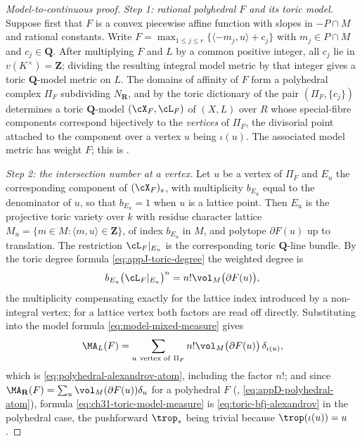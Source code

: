 \begin{proof}[Model-to-continuous proof]
\emph{Step 1: rational polyhedral $F$ and its toric model.}  Suppose
first that $F$ is a convex piecewise affine function with slopes in
$-P\cap M$ and rational constants.  Write
$F=\max_{1\leq j\leq r}\{\langle -m_j,u\rangle+c_j\}$ with
$m_j\in P\cap M$ and $c_j\in\mathbf Q$.  After multiplying $F$ and
$L$ by a common positive integer, all $c_j$ lie in
$v(K^\times)=\mathbf Z$; dividing the resulting integral model metric by
that integer gives a toric $\mathbf Q$-model metric on $L$.  The domains of affinity of
$F$ form a polyhedral complex $\Pi_F$ subdividing $N_\mathbf R$, and
by the toric dictionary of  the pair
$(\Pi_F,\{c_j\})$ determines a toric $\mathbf Q$-model
$(\cX_F,\cL_F)$ of $(X,L)$ over $R$ whose special-fibre components correspond bijectively
to the \emph{vertices} of $\Pi_F$, the divisorial point attached to the
component over a vertex $u$ being $\iota(u)$.  The associated model
metric has weight $F$; this is .

\emph{Step 2: the intersection number at a vertex.}  Let $u$ be a vertex
of $\Pi_F$ and $E_u$ the corresponding component of $(\cX_F)_s$, with
multiplicity $b_{E_u}$ equal to the denominator of $u$, so that
$b_{E_u}=1$ when $u$ is a lattice point.  Then $E_u$ is the
projective toric variety over $k$ with residue character lattice
$M_u=\{m\in M:\langle m,u\rangle\in\mathbf Z\}$, of index $b_{E_u}$ in
$M$, and polytope $\partial F(u)$ up to translation.  The restriction
$\cL_F|_{E_u}$ is the corresponding toric $\mathbf Q$-line bundle.  By the toric degree
formula \eqref{eq:appJ-toric-degree} the weighted degree is
\begin{equation}
\label{eq:ch31-toric-vertex-degree}
 b_{E_u}\bigl(\cL_F|_{E_u}\bigr)^n=n!\vol_M\bigl(\partial F(u)\bigr),
\end{equation}
the multiplicity compensating exactly for the lattice index introduced by a
non-integral vertex; for a lattice vertex both factors are read off
directly.  Substituting into the model formula
\eqref{eq:model-mixed-measure} gives
\begin{equation}
\label{eq:ch31-toric-model-measure}
 \MA_L(F)=\sum_{u\ \text{vertex of}\ \Pi_F}
      n!\vol_M\bigl(\partial F(u)\bigr)\,\delta_{\iota(u)},
\end{equation}
which is \eqref{eq:polyhedral-alexandrov-atom}, including the factor
$n!$; and since $\MA_{\mathbf R}(F)
 =\sum_u\vol_M(\partial F(u))\delta_u$ for a polyhedral $F$
(, \eqref{eq:appD-polyhedral-atom}),
formula \eqref{eq:ch31-toric-model-measure} is
\eqref{eq:toric-bfj-alexandrov} in the polyhedral case, the pushforward
$\trop_*$ being trivial because $\trop(\iota(u))=u$.


\end{proof}
